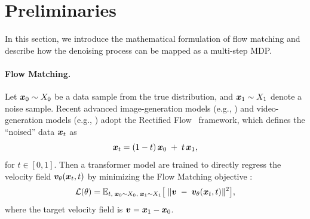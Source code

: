 \section{Preliminaries}\label{sec:preliminaries}

In this section, we introduce the mathematical formulation of flow matching and describe how the denoising process can be mapped as a multi-step MDP.


\paragraph{Flow Matching.}\label{subsec:flow_matching}
Let \({\bm{x}}_0 \sim X_0\) be a data sample from the true distribution, and \({\bm{x}}_1 \sim X_1\) denote a noise sample. Recent advanced image-generation models (e.g., \cite{sd3,flux2024}) and video-generation models (e.g., \cite{kling,sora,wanx,hunyuanvideo}) adopt the Rectified Flow~\cite{rectified_flow} framework, which defines the “noised” data \({\bm{x}}_t\) as
\begin{equation}
\label{eq:flow_forward}
    {\bm{x}}_t = (1-t)\,{\bm{x}}_0 \;+\; t\,{\bm{x}}_1,
\end{equation}
for \(t \in [0,1]\). Then a transformer model are trained to directly regress the velocity field \({\bm{v}}_\theta({\bm{x}}_t, t)\) by minimizing the Flow Matching objective \cite{lipman2022flow,rectified_flow}:
\begin{equation}
\label{eq:flow_loss}
    \mathcal{L}(\theta) = \mathbb{E}_{t,\;{\bm{x}}_0\sim X_0,\;{\bm{x}}_1 \sim X_1} 
    \bigl[\;\|{\bm{v}} \;-\; {\bm{v}}_\theta({\bm{x}}_t,t)\|^2\bigr],
\end{equation}
where the target velocity field is \({\bm{v}} = {\bm{x}}_1 - {\bm{x}}_0\).

